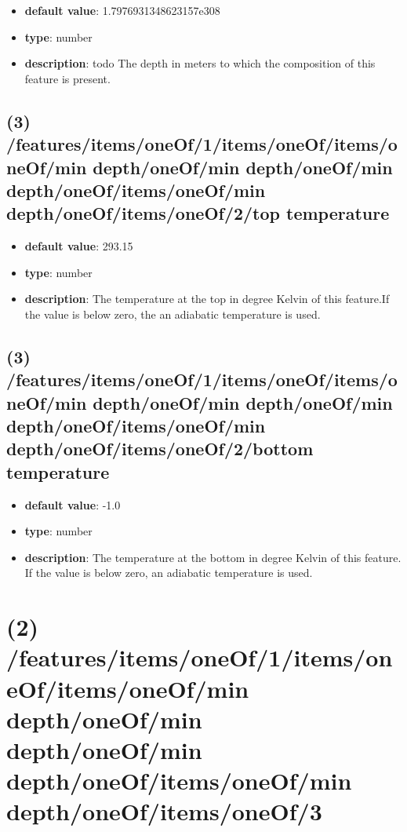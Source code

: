 \begin{itemize}[leftmargin=3em]\item {\bf default value}: 1.7976931348623157e308
\item {\bf type}: number
\item {\bf description}: todo The depth in meters to which the composition of this feature is present.
\end{itemize}\subsection{(3) /features/items/oneOf/1/items/oneOf/items/oneOf/min depth/oneOf/min depth/oneOf/min depth/oneOf/items/oneOf/min depth/oneOf/items/oneOf/2/top temperature}
\begin{itemize}[leftmargin=3em]\item {\bf default value}: 293.15
\item {\bf type}: number
\item {\bf description}: The temperature at the top in degree Kelvin of this feature.If the value is below zero, the an adiabatic temperature is used.
\end{itemize}\subsection{(3) /features/items/oneOf/1/items/oneOf/items/oneOf/min depth/oneOf/min depth/oneOf/min depth/oneOf/items/oneOf/min depth/oneOf/items/oneOf/2/bottom temperature}
\begin{itemize}[leftmargin=3em]\item {\bf default value}: -1.0
\item {\bf type}: number
\item {\bf description}: The temperature at the bottom in degree Kelvin of this feature. If the value is below zero, an adiabatic temperature is used.
\end{itemize}\section{(2) /features/items/oneOf/1/items/oneOf/items/oneOf/min depth/oneOf/min depth/oneOf/min depth/oneOf/items/oneOf/min depth/oneOf/items/oneOf/3}
